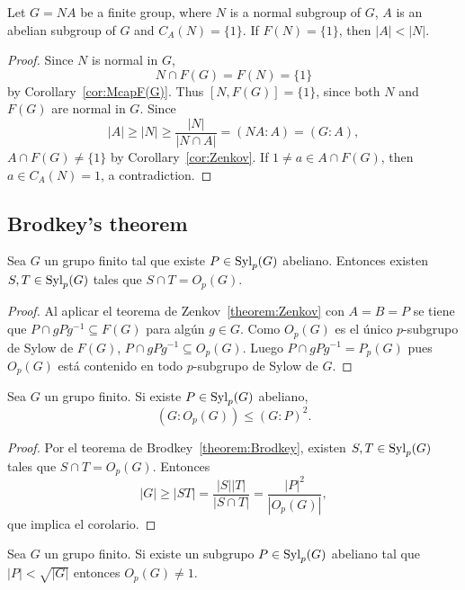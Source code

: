 \begin{corollary}
	Let $G=NA$ be a finite group, where $N$ is a normal subgroup of $G$, $A$ is an abelian subgroup of $G$ and 
	$C_A(N)=\{1\}$. If $F(N)=\{1\}$, then $|A|<|N|$. 
\end{corollary}

\begin{proof}
	Since $N$ is normal in $G$, 
	\[
    N\cap F(G)=F(N)=\{1\}
    \]
    by Corollary~\ref{cor:McapF(G)}. Thus $[N,F(G)]=\{1\}$, since 
	both $N$ and $F(G)$ are normal in $G$. Since 
	\[
	|A|\geq |N|\geq \frac{|N|}{|N\cap A|}=(NA:A)=(G:A),
	\]
	$A\cap F(G)\ne\{1\}$ by Corollary~\ref{cor:Zenkov}. If $1\ne a\in
	A\cap F(G)$, then $a\in C_A(N)=1$, a contradiction. 
\end{proof}

\subsection{Brodkey's theorem}

\begin{theorem}[Brodkey]
	\label{theorem:Brodkey}
	Sea $G$ un grupo finito tal que existe $P\in\mathrm{Syl}_p(G)$ abeliano. Entonces
	existen $S,T\in\mathrm{Syl}_p(G)$ tales que $S\cap T=O_p(G)$.
\end{theorem}

\begin{proof}
	Al aplicar el teorema de Zenkov~\ref{theorem:Zenkov} con $A=B=P$ se tiene
	que $P\cap gPg^{-1}\subseteq F(G)$ para algún $g\in G$. Como $O_p(G)$ es el
	único $p$-subgrupo de Sylow de $F(G)$, $P\cap gPg^{-1}\subseteq O_p(G)$.
	Luego $P\cap gPg^{-1}=P_p(G)$ pues $O_p(G)$ está contenido en todo
	$p$-subgrupo de Sylow de $G$.
\end{proof}

\begin{corollary}
	\label{corollary:GP2}
	Sea $G$ un grupo finito. Si existe $P\in \mathrm{Syl}_p(G)$ abeliano,
	\[
	(G:O_p(G))\leq (G:P)^2. 
	\]
\end{corollary}

\begin{proof}
	Por el teorema de Brodkey~\ref{theorem:Brodkey}, existen $S,T\in\mathrm{Syl}_p(G)$
	tales que $S\cap T=O_p(G)$. Entonces
	\[
		|G|\geq |ST|=\frac{|S||T|}{|S\cap T|}=\frac{|P|^2}{|O_p(G)|},
	\]
	que implica el corolario.
\end{proof}

\begin{corollary}
	Sea $G$ un grupo finito. Si existe un subgrupo $P\in\mathrm{Syl}_p(G)$ abeliano tal que
	$|P|<\sqrt{|G|}$ entonces $O_p(G)\ne1$.
\end{corollary}

